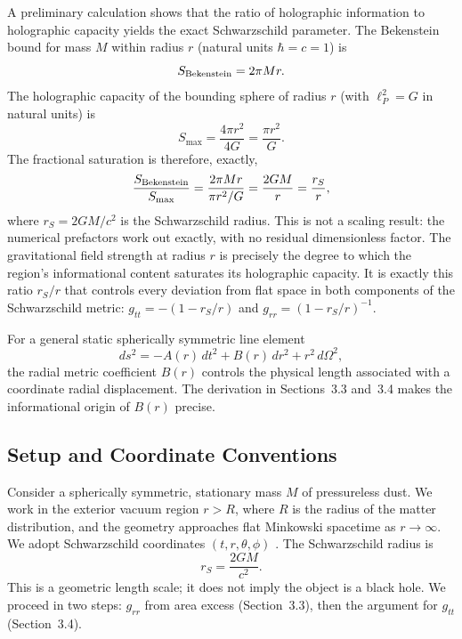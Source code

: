 \documentclass[12pt]{article}
\begin{document}
A preliminary calculation shows that the ratio of holographic
information to holographic capacity yields the exact Schwarzschild
parameter.
The Bekenstein bound for mass $M$ within radius $r$ (natural units
$\hbar = c = 1$) is
\begin{equation*}
  S_{\rm Bekenstein} = 2\pi Mr.
\end{equation*}
The holographic capacity of the bounding sphere of radius $r$
(with $\ell_P^2 = G$ in natural units) is
\begin{equation*}
  S_{\max} = \frac{4\pi r^2}{4G} = \frac{\pi r^2}{G}.
\end{equation*}
The fractional saturation is therefore, exactly,
\begin{equation*}
  \frac{S_{\rm Bekenstein}}{S_{\max}}
  = \frac{2\pi Mr}{\pi r^2/G}
  = \frac{2GM}{r}
  = \frac{r_S}{r},
\end{equation*}
where $r_S = 2GM/c^2$ is the Schwarzschild radius.
This is not a scaling result: the numerical prefactors work out
exactly, with no residual dimensionless factor.
The gravitational field strength at radius $r$ is precisely the
degree to which the region's informational content saturates its
holographic capacity.
It is exactly this ratio $r_S/r$ that controls every deviation from
flat space in both components of the Schwarzschild metric:
$g_{tt} = -(1 - r_S/r)$ and $g_{rr} = (1 - r_S/r)^{-1}$.

For a general static spherically symmetric line element
\cite{Wald1984}
\begin{equation}
  ds^2 = -A(r)\,dt^2 + B(r)\,dr^2 + r^2\,d\Omega^2,
  \label{eq:general-metric}
\end{equation}
the radial metric coefficient $B(r)$ controls the physical length
associated with a coordinate radial displacement.
The derivation in Sections~3.3 and~3.4 makes the informational
origin of $B(r)$ precise.

\subsection{Setup and Coordinate Conventions}
\label{sec:setup}

Consider a spherically symmetric, stationary mass $M$ of pressureless
dust.
We work in the exterior vacuum region $r > R$, where $R$ is the radius
of the matter distribution, and the geometry approaches flat Minkowski
spacetime as $r \to \infty$.
We adopt Schwarzschild coordinates $(t, r, \theta, \phi)$ \cite{Wald1984}.
The Schwarzschild radius is
\begin{equation}
  r_S = \frac{2GM}{c^2}.
  \label{eq:rs}
\end{equation}
This is a geometric length scale; it does not imply the object is a
black hole.
We proceed in two steps: $g_{rr}$ from area excess (Section~3.3),
then the argument for $g_{tt}$ (Section~3.4).
\end{document}

